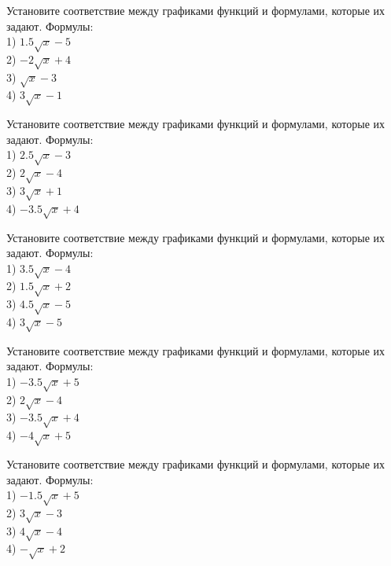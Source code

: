 \documentclass[4apaper]{article}
\begin{document}
\begin{taskBN}{86}
Установите соответствие между графиками функций и формулами, которые их задают. Формулы: \\1) $1.5\sqrt{x}-5$\\2) $-2\sqrt{x}+4$\\3) $\sqrt{x}-3$\\4) $3\sqrt{x}-1$
\end{taskBN}

\begin{taskBN}{87}
Установите соответствие между графиками функций и формулами, которые их задают. Формулы: \\1) $2.5\sqrt{x}-3$\\2) $2\sqrt{x}-4$\\3) $3\sqrt{x}+1$\\4) $-3.5\sqrt{x}+4$
\end{taskBN}

\begin{taskBN}{88}
Установите соответствие между графиками функций и формулами, которые их задают. Формулы: \\1) $3.5\sqrt{x}-4$\\2) $1.5\sqrt{x}+2$\\3) $4.5\sqrt{x}-5$\\4) $3\sqrt{x}-5$
\end{taskBN}

\begin{taskBN}{89}
Установите соответствие между графиками функций и формулами, которые их задают. Формулы: \\1) $-3.5\sqrt{x}+5$\\2) $2\sqrt{x}-4$\\3) $-3.5\sqrt{x}+4$\\4) $-4\sqrt{x}+5$
\end{taskBN}

\begin{taskBN}{90}
Установите соответствие между графиками функций и формулами, которые их задают. Формулы: \\1) $-1.5\sqrt{x}+5$\\2) $3\sqrt{x}-3$\\3) $4\sqrt{x}-4$\\4) $-\sqrt{x}+2$
\end{taskBN}
\end{document}
